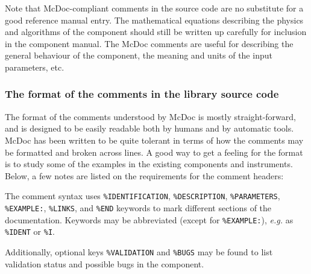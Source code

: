 Note that McDoc-compliant comments in the source code are no substitute
for a good reference manual entry. The mathematical equations describing
the physics and algorithms of the component should still be written up
carefully for inclusion in the component manual. The McDoc comments are
useful for describing the general behaviour of the component, the
meaning and units of the input parameters, etc.


\subsubsection{The format of the comments in the library source code}

The format of the comments understood by McDoc is mostly
straight-forward, and is designed to be easily readable both by humans
and by automatic tools. McDoc has been written to be quite tolerant in
terms of how the comments may be formatted and broken across lines. A
good way to get a feeling for the format is to study some of the examples
in the existing components and instruments. Below, a few
notes are listed on the requirements for the comment headers:

The comment syntax uses \verb+%IDENTIFICATION+, \verb+%DESCRIPTION+,
\verb+%PARAMETERS+, \verb+%EXAMPLE:+, \verb+%LINKS+, and \verb+%END+
keywords to mark different sections of the documentation. Keywords may
be abbreviated (except for \verb+%EXAMPLE:+), \textit{e.g.} as \verb+%IDENT+ or \verb+%I+.

Additionally, optional keys \verb+%VALIDATION+ and \verb+%BUGS+ may be found to list validation status and possible bugs in the component.

